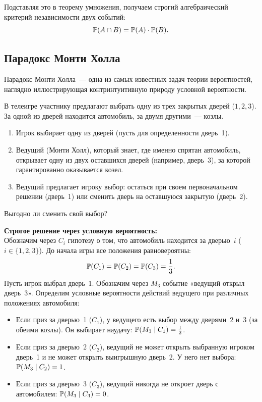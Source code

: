 Подставляя это в теорему умножения, получаем строгий алгебраический критерий независимости двух событий:
\[
\mathbb{P}(A \cap B) = \mathbb{P}(A) \cdot \mathbb{P}(B).
\]

\subsection{Парадокс Монти Холла}

Парадокс Монти Холла~--- одна из самых известных задач теории вероятностей, наглядно иллюстрирующая контринтуитивную природу условной вероятности.

\begin{example}
В телеигре участнику предлагают выбрать одну из трех закрытых дверей ($1, 2, 3$). За одной из дверей находится автомобиль, за двумя другими~--- козлы. 
\begin{enumerate}
\item Игрок выбирает одну из дверей (пусть для определенности дверь~1).
\item Ведущий (Монти Холл), который знает, где именно спрятан автомобиль, открывает одну из двух оставшихся дверей (например, дверь~3), за которой гарантированно оказывается козел.
\item Ведущий предлагает игроку выбор: остаться при своем первоначальном решении (дверь~1) или сменить дверь на оставшуюся закрытую (дверь~2).
\end{enumerate}
Выгодно ли сменить свой выбор?

\textbf{Строгое решение через условную вероятность:} \\
Обозначим через $C_i$ гипотезу о том, что автомобиль находится за дверью~$i$ ($i \in \{1, 2, 3\}$). До начала игры все положения равновероятны:
\[
\mathbb{P}(C_1) = \mathbb{P}(C_2) = \mathbb{P}(C_3) = \frac{1}{3}.
\]
Пусть игрок выбрал дверь~1. Обозначим через $M_3$ событие «ведущий открыл дверь~3». 
Определим условные вероятности действий ведущего при различных положениях автомобиля:
\begin{itemize}
\item Если приз за дверью~1 ($C_1$), у ведущего есть выбор между дверями~2 и~3 (за обеими козлы). Он выбирает наудачу: $\mathbb{P}(M_3 \mid C_1) = \frac{1}{2}$.
\item Если приз за дверью~2 ($C_2$), ведущий не может открыть выбранную игроком дверь~1 и не может открыть выигрышную дверь~2. У него нет выбора: $\mathbb{P}(M_3 \mid C_2) = 1$.
\item Если приз за дверью~3 ($C_3$), ведущий никогда не откроет дверь с автомобилем: $\mathbb{P}(M_3 \mid C_3) = 0$.
\end{itemize}


\end{example}
